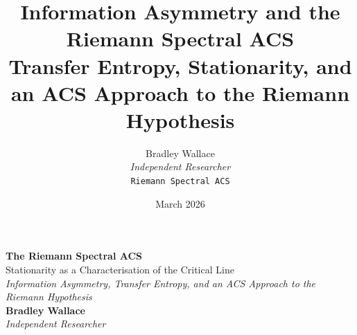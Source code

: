 \documentclass[11pt,a4paper]{article}
\title{\textbf{Information Asymmetry and the Riemann Spectral ACS}\\[0.4em]
       \large Transfer Entropy, Stationarity, and an ACS Approach to the Riemann Hypothesis}
\author{Bradley Wallace\\[0.3em]
        \small \textit{Independent Researcher}\\[0.2em]
        \small \texttt{Riemann Spectral ACS}}
\date{March 2026}
\theoremstyle{plain}
\theoremstyle{definition}
\theoremstyle{remark}
\begin{document}
\begin{titlepage}
\thispagestyle{empty}

\noindent{\color{acsrule}\rule{\textwidth}{0.4pt}}
\vspace{6pt}
\vspace{6pt}
\noindent{\color{acsrule}\rule{\textwidth}{0.4pt}}

\vspace{0.6in}

\begin{center}
  {\Huge\bfseries\color{acsprimary} The Riemann Spectral ACS}\\[0.4em]
  {\Large\color{acsslate} Stationarity as a Characterisation of the Critical Line}\\[1.2em]
  {\normalsize\itshape\color{acsslate}
    Information Asymmetry, Transfer Entropy, and an ACS Approach to the Riemann Hypothesis}\\[2.0em]
  {\large\bfseries Bradley Wallace}\\[0.25em]
  {\small\itshape\color{acsslate} Independent Researcher}
\end{center}

\vspace{0.5in}


\end{titlepage}
\end{document}
